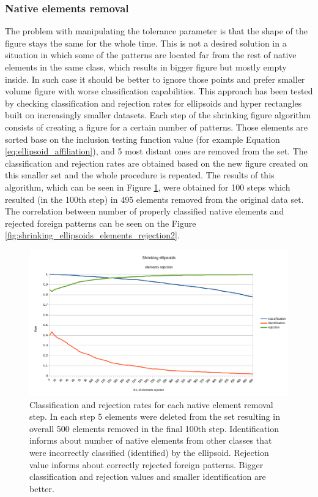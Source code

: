 \subsubsection{Native elements removal}

The problem with manipulating the tolerance parameter is that the shape of the figure stays the same for the whole time. This is not a desired solution in a situation in which some of the patterns are located far from the rest of native elements in the same class, which results in bigger figure but mostly empty inside. In such case it should be better to ignore those points and prefer smaller volume figure with worse classification capabilities. This approach has been tested by checking classification and rejection rates for ellipsoids and hyper rectangles built on increasingly smaller datasets. Each step of the shrinking figure algorithm consists of creating a figure for a certain number of patterns. Those elements are sorted base on the inclusion testing function value (for example Equation \ref{eq:ellipsoid_affiliation}), and 5 most distant ones are removed from the set. The classification and rejection rates are obtained based on the new figure created on this smaller set and the whole procedure is repeated. The results of this algorithm, which can be seen in Figure \ref{fig:shrinking_ellipsoids_elements_rejection}, were obtained for 100 steps which resulted (in the 100th step) in 495 elements removed from the original data set. The correlation between number of properly classified native elements and rejected foreign patterns can be seen on the Figure \ref{fig:shrinking_ellipsoids_elements_rejection2}.

\begin{figure}[htp]
	\centering
	\includegraphics[width=1.\textwidth]{Figures/shrinking_ellipsoid_elements_rejection.png}
	\caption{ Classification and rejection rates for each native element removal step. In each step 5 elements were deleted from the set resulting in overall 500 elements removed in the final 100th step. Identification informs about number of native elements from other classes that were incorrectly classified (identified) by the ellipsoid. Rejection value informs about correctly rejected foreign patterns. Bigger classification and rejection values and smaller identification are better. }
	\label{fig:shrinking_ellipsoids_elements_rejection}\vspace{-3pt}
\end{figure}

